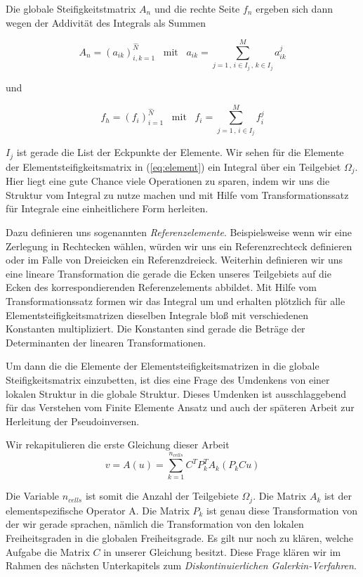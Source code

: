 Die globale Steifigkeitstmatrix $A_n$ und die rechte Seite $f_n$ ergeben sich dann wegen der Addivität des Integrals als Summen

\begin{equation*}
A_n = (a_{ik})_{i,k=1}^{\hat{N}} \, \, \, \text{ mit } \, \, \, a_{ik} = \sum_{j=1 \, , \, i \in I_j \, , \, k \in I_j }^M a_{ik}^j 
\end{equation*}

und

\begin{equation*}
f_h = (f_i)_{i=1}^{\hat{N}} \, \, \, \text{ mit } \, \, \, f_i = \sum_{j=1 \, , \, i \in I_j}^M f_i^j
\end{equation*}

$I_j$ ist gerade die List der Eckpunkte der Elemente.
Wir sehen für die Elemente der Elementsteifigkeitsmatrix in (\ref{eq:element}) ein Integral über ein Teilgebiet $\Omega_j$. Hier liegt eine gute Chance viele Operationen zu sparen, indem wir uns die Struktur vom Integral zu nutze machen und mit Hilfe vom Transformationssatz für Integrale eine einheitlichere Form herleiten.

Dazu definieren uns sogenannten \textit{Referenzelemente}. Beispielsweise wenn wir eine Zerlegung in Rechtecken wählen, würden wir uns ein Referenzrechteck definieren oder im Falle von Dreieicken ein Referenzdreieck. Weiterhin definieren wir uns eine lineare Transformation die gerade die Ecken unseres Teilgebiets auf die Ecken des korrespondierenden Referenzelements abbildet. Mit Hilfe vom Transformationssatz formen wir das Integral um und erhalten plötzlich für alle Elementsteifigkeitsmatrizen dieselben Integrale bloß mit verschiedenen Konstanten multipliziert. Die Konstanten sind gerade die Beträge der Determinanten der linearen Transformationen.

Um dann die die Elemente der Elementsteifigkeitsmatrizen in die globale Steifigkeitsmatrix einzubetten, ist dies eine Frage des Umdenkens von einer lokalen Struktur in die globale Struktur.
Dieses Umdenken ist ausschlaggebend für das Verstehen vom Finite Elemente Ansatz und auch der späteren Arbeit zur Herleitung der Pseudoinversen.

Wir rekapitulieren die erste Gleichung dieser Arbeit
\begin{equation} \label{eq:main2}
v=A(u)=\sum_{k=1}^{n_{cells}} C^T P_k^T A_k (P_k Cu)
\end{equation}

Die Variable $n_{cells}$ ist somit die Anzahl der Teilgebiete $\Omega_j$. Die Matrix $A_k$ ist der elementspezifische Operator A. Die Matrix $P_k$ ist genau diese Transformation von der wir gerade sprachen, nämlich die Transformation von den lokalen Freiheitsgraden in die globalen Freiheitsgrade. Es gilt nur noch zu klären, welche Aufgabe die Matrix $C$ in unserer Gleichung besitzt. Diese Frage klären wir im Rahmen des nächsten Unterkapitels zum \textit{Diskontinuierlichen Galerkin-Verfahren}.

